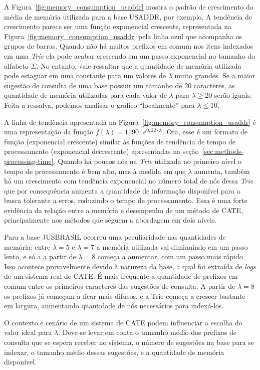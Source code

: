 A Figura~\ref{fig:memory_consumption_usaddr} mostra o padrão de crescimento da média de memória utilizada para a base USADDR, por exemplo. A tendência de crescimento parece ser uma função exponencial crescente, representada na Figura~\ref{fig:memory_consumption_usaddr} pela linha azul que acompanha os grupos de barras. Quando não há muitos prefixos em comum nos itens indexados em uma \textit{Trie} ela pode acabar crescendo em um passo exponencial no tamanho do alfabeto $\Sigma$.  No entanto, vale ressaltar que a quantidade de memória utilizada pode estagnar em uma constante para um valores de $\lambda$ muito grandes. Se a maior sugestão de consulta de uma base possuir um tamanho de 20 caracteres, as quantidade de memória utilizadas para cada valor de $\lambda$ para $\lambda \geq 20$ serão iguais. Feita a ressalva, podemos analisar o gráfico ``localmente'' para $\lambda \leq 10$.

A linha de tendência apresentada na Figura~\ref{fig:memory_consumption_usaddr} é uma representação da função $f(\lambda)=1190\cdot e^{0,22\cdot\lambda}$. Ora, esse é um formato de função (exponencial crescente) similar às funções de tendência de tempo de processamento (exponencial decrescente) apresentadas na seção~\ref{sec:methods-processing-time}. Quando há poucos nós na \textit{Trie} utilizada no primeiro nível o tempo de processamento é bem alto, mas à medida em que $\lambda$ aumenta, também há um crescimento com tendência exponencial no número total de nós dessa \textit{Trie} que por consequência aumenta a quantidade de informação disponível para a busca tolerante a erros, reduzindo o tempo de processamento. Essa é uma forte evidência da relação entre a memória e desempenho de um método de CATE, principalmente nos métodos que seguem a abordagem em dois níveis.

Para a base JUSBRASIL ocorreu uma peculiaridade nas quantidades de memória: entre $\lambda=5$ e $\lambda=7$ a memória utilizada vai diminuindo em um passo lento, e só a a partir de $\lambda=8$ começa a aumentar, com um passo mais rápido Isso acontece provavelmente devido à natureza da base, a qual foi extraída de \textit{logs} de um sistema real de CATE. É mais frequente a quantidade de prefixos em comum entre os primeiros caracteres das sugestões de consulta. A partir de $\lambda=8$ os prefixos já começam a ficar mais difusos, e a Trie começa a crescer bastante em largura, aumentando quantidade de nós necessários para indexá-los.

O contexto e cenário de um sistema de CATE podem influenciar a escolha do valor ideal para $\lambda$. Deve-se levar em conta o tamanho médio dos prefixos de consulta que se espera receber no sistema, o número de sugestões na base para se indexar, o tamanho médio dessas sugestões, e a quantidade de memória disponível. 

